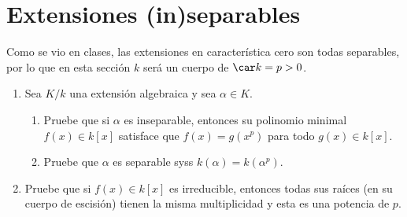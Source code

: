 \documentclass[11pt, reqno]{amsart}
\begin{document}
\section{Extensiones (in)separables}
Como se vio en clases, las extensiones en característica cero son todas separables, por lo que en esta sección $k$ será
un cuerpo de $\car k = p > 0$.
\begin{enumerate}[resume]
	\item Sea $K/k$ una extensión algebraica y sea $\alpha \in K$.
		\begin{enumerate}
			\item Pruebe que si $\alpha$ es inseparable, entonces su polinomio minimal $f(x) \in k[x]$
				satisface que $f(x) = g(x^p)$ para todo $g(x) \in k[x]$.
			\item Pruebe que $\alpha$ es separable syss $k(\alpha) = k(\alpha^p)$.
		\end{enumerate}

	\item Pruebe que si $f(x) \in k[x]$ es irreducible, entonces todas sus raíces (en su cuerpo de escisión) tienen
		la misma multiplicidad y esta es una potencia de $p$.

\end{enumerate}


\nocite{lang:algebra}

\printbibliography
\end{document}
